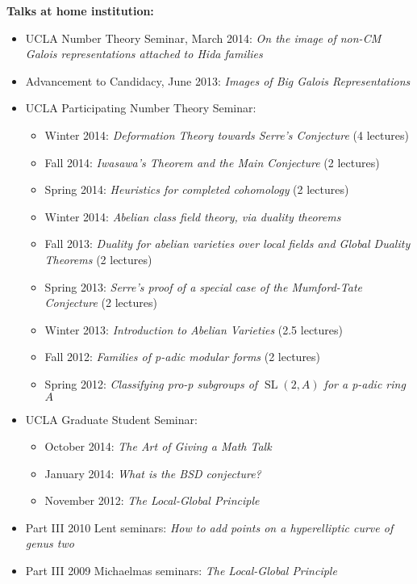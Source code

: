 \documentclass[10pt]{article}
\theoremstyle{plain} \numberwithin{equation}{section}
\theoremstyle{definition}
\DeclareMathOperator{\SL}{SL}
\begin{document}
\textbf{Talks at home institution:}
\begin{itemize}
\item[] UCLA Number Theory Seminar, March 2014: \textit{On the image of non-CM Galois 			representations attached to Hida families}
\item[] Advancement to Candidacy, June 2013: \textit{Images of Big Galois Representations}
\item[] UCLA Participating Number Theory Seminar:
	\begin{itemize}
		\item[] Winter 2014: \textit{Deformation Theory towards Serre's Conjecture} (4 lectures)
		\item[] Fall 2014: \textit{Iwasawa's Theorem and the Main Conjecture} (2 lectures)
		\item[] Spring 2014: \textit{Heuristics for completed cohomology} (2 lectures)
		\item[] Winter 2014: \textit{Abelian class field theory, via duality theorems}
		\item[] Fall 2013: \textit{Duality for abelian varieties over local fields and Global Duality 			Theorems} (2 lectures)
		\item[] Spring 2013: \textit{Serre's proof of a special case of the Mumford-Tate Conjecture} (2 lectures)
    		\item[] Winter 2013: \textit{Introduction to Abelian Varieties} (2.5 lectures)
		\item[] Fall 2012: \textit{Families of p-adic modular forms} (2 lectures)
		\item[] Spring 2012: \textit{Classifying pro-p subgroups of $\SL(2, A)$ for a p-adic ring $A$}
	\end{itemize}
\item[] UCLA Graduate Student Seminar:
	\begin{itemize}
		\item[] October 2014: \textit{The Art of Giving a Math Talk}
		\item[] January 2014: \textit{What is the BSD conjecture?}
		\item[] November 2012: \textit{The Local-Global Principle}
	\end{itemize}
\item[] Part III 2010 Lent seminars: \textit{How to add points on a hyperelliptic curve of genus two}
\item[] Part III 2009 Michaelmas seminars: \textit{The Local-Global Principle}
\end{itemize}
\end{document}
